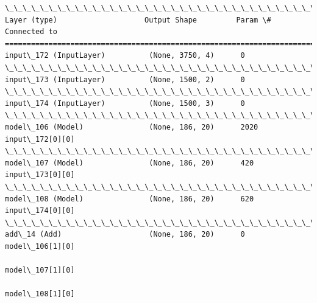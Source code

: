 \documentclass[11pt]{article}
\begin{document}
    \begin{Verbatim}[commandchars=\\\{\}]
\_\_\_\_\_\_\_\_\_\_\_\_\_\_\_\_\_\_\_\_\_\_\_\_\_\_\_\_\_\_\_\_\_\_\_\_\_\_\_\_\_\_\_\_\_\_\_\_\_\_\_\_\_\_\_\_\_\_\_\_\_\_\_\_\_\_\_\_\_\_\_\_\_\_\_\_\_\_\_\_\_\_\_\_\_\_\_\_\_\_\_\_\_\_\_\_\_\_
Layer (type)                    Output Shape         Param \#     Connected to                     
==================================================================================================
input\_172 (InputLayer)          (None, 3750, 4)      0                                            
\_\_\_\_\_\_\_\_\_\_\_\_\_\_\_\_\_\_\_\_\_\_\_\_\_\_\_\_\_\_\_\_\_\_\_\_\_\_\_\_\_\_\_\_\_\_\_\_\_\_\_\_\_\_\_\_\_\_\_\_\_\_\_\_\_\_\_\_\_\_\_\_\_\_\_\_\_\_\_\_\_\_\_\_\_\_\_\_\_\_\_\_\_\_\_\_\_\_
input\_173 (InputLayer)          (None, 1500, 2)      0                                            
\_\_\_\_\_\_\_\_\_\_\_\_\_\_\_\_\_\_\_\_\_\_\_\_\_\_\_\_\_\_\_\_\_\_\_\_\_\_\_\_\_\_\_\_\_\_\_\_\_\_\_\_\_\_\_\_\_\_\_\_\_\_\_\_\_\_\_\_\_\_\_\_\_\_\_\_\_\_\_\_\_\_\_\_\_\_\_\_\_\_\_\_\_\_\_\_\_\_
input\_174 (InputLayer)          (None, 1500, 3)      0                                            
\_\_\_\_\_\_\_\_\_\_\_\_\_\_\_\_\_\_\_\_\_\_\_\_\_\_\_\_\_\_\_\_\_\_\_\_\_\_\_\_\_\_\_\_\_\_\_\_\_\_\_\_\_\_\_\_\_\_\_\_\_\_\_\_\_\_\_\_\_\_\_\_\_\_\_\_\_\_\_\_\_\_\_\_\_\_\_\_\_\_\_\_\_\_\_\_\_\_
model\_106 (Model)               (None, 186, 20)      2020        input\_172[0][0]                  
\_\_\_\_\_\_\_\_\_\_\_\_\_\_\_\_\_\_\_\_\_\_\_\_\_\_\_\_\_\_\_\_\_\_\_\_\_\_\_\_\_\_\_\_\_\_\_\_\_\_\_\_\_\_\_\_\_\_\_\_\_\_\_\_\_\_\_\_\_\_\_\_\_\_\_\_\_\_\_\_\_\_\_\_\_\_\_\_\_\_\_\_\_\_\_\_\_\_
model\_107 (Model)               (None, 186, 20)      420         input\_173[0][0]                  
\_\_\_\_\_\_\_\_\_\_\_\_\_\_\_\_\_\_\_\_\_\_\_\_\_\_\_\_\_\_\_\_\_\_\_\_\_\_\_\_\_\_\_\_\_\_\_\_\_\_\_\_\_\_\_\_\_\_\_\_\_\_\_\_\_\_\_\_\_\_\_\_\_\_\_\_\_\_\_\_\_\_\_\_\_\_\_\_\_\_\_\_\_\_\_\_\_\_
model\_108 (Model)               (None, 186, 20)      620         input\_174[0][0]                  
\_\_\_\_\_\_\_\_\_\_\_\_\_\_\_\_\_\_\_\_\_\_\_\_\_\_\_\_\_\_\_\_\_\_\_\_\_\_\_\_\_\_\_\_\_\_\_\_\_\_\_\_\_\_\_\_\_\_\_\_\_\_\_\_\_\_\_\_\_\_\_\_\_\_\_\_\_\_\_\_\_\_\_\_\_\_\_\_\_\_\_\_\_\_\_\_\_\_
add\_14 (Add)                    (None, 186, 20)      0           model\_106[1][0]                  
                                                                 model\_107[1][0]                  
                                                                 model\_108[1][0]                  

\end{Verbatim}
\end{document}
